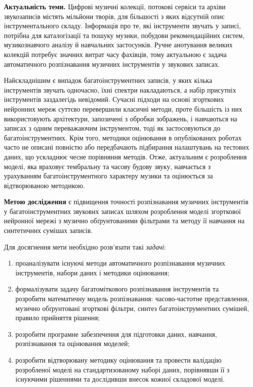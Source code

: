 
\textbf{Актуальність теми.} Цифрові музичні колекції, потокові сервіси та
архіви звукозаписів містять мільйони творів, для більшості з яких відсутній
опис інструментального складу. Інформація про те, які інструменти звучать у
записі, потрібна для каталогізації та пошуку музики, побудови рекомендаційних
систем, музикознавчого аналізу й навчальних застосунків. Ручне анотування
великих колекцій потребує значних витрат часу фахівців, тому актуальною є
задача автоматичного розпізнавання музичних інструментів у звукових записах.

Найскладнішим є випадок багатоінструментних записів, у яких кілька
інструментів звучать одночасно, їхні спектри накладаються, а набір
присутніх інструментів заздалегідь невідомий. Сучасні підходи на основі
згорткових нейронних мереж суттєво перевершили класичні методи, проте
більшість із них використовують архітектури, запозичені з обробки
зображень, і навчаються на записах з одним переважаючим інструментом, тоді
як застосовуються до багатоінструментних. Крім того, методики оцінювання в
опублікованих роботах часто не описані повністю або передбачають
підбирання налаштувань на тестових даних, що ускладнює чесне порівняння
методів. Отже, актуальним є розроблення моделі, яка враховує тембральну та
часову будову звуку, навчається з урахуванням багатоінструментного
характеру музики та оцінюється за відтворюваною методикою.

\textbf{Метою дослідження} є підвищення точності розпізнавання музичних
інструментів у багатоінструментних звукових записах шляхом розроблення
моделі згорткової нейронної мережі з музично обґрунтованими фільтрами та
методу її навчання на синтетичних сумішах записів.

Для досягнення мети необхідно розв'язати такі \textit{задачі}:
\begin{enumerate}
    \item проаналізувати існуючі методи автоматичного розпізнавання музичних
    інструментів, набори даних і методики оцінювання;
    \item формалізувати задачу багатоміткового розпізнавання інструментів та
    розробити математичну модель розпізнавання: часово-частотне представлення,
    музично обґрунтовані згорткові фільтри, синтез багатоінструментних
    сумішей, правило прийняття рішення;
    \item розробити програмне забезпечення для підготовки даних, навчання,
    розпізнавання та оцінювання моделей;
    \item розробити відтворювану методику оцінювання та провести валідацію
    розробленої моделі на стандартизованому наборі даних, порівнявши її з
    існуючими рішеннями та дослідивши внесок кожної складової моделі.
\end{enumerate}


